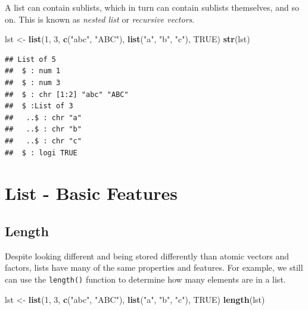 \documentclass[
]{book}
\newenvironment{Shaded}{\begin{snugshade}}{\end{snugshade}}
\newcommand{\DecValTok}[1]{\textcolor[rgb]{0.00,0.00,0.81}{#1}}
\newcommand{\KeywordTok}[1]{\textcolor[rgb]{0.13,0.29,0.53}{\textbf{#1}}}
\newcommand{\NormalTok}[1]{#1}
\newcommand{\OtherTok}[1]{\textcolor[rgb]{0.56,0.35,0.01}{#1}}
\newcommand{\StringTok}[1]{\textcolor[rgb]{0.31,0.60,0.02}{#1}}
\begin{document}
A list can contain sublists, which in turn can contain sublists themselves, and so on. This is known as \emph{nested list} or \emph{recursive vectors}.

\begin{Shaded}
\begin{Highlighting}[]
\NormalTok{lst <-}\StringTok{ }\KeywordTok{list}\NormalTok{(}\DecValTok{1}\NormalTok{, }\DecValTok{3}\NormalTok{, }\KeywordTok{c}\NormalTok{(}\StringTok{"abc"}\NormalTok{,}
    \StringTok{"ABC"}\NormalTok{), }\KeywordTok{list}\NormalTok{(}\StringTok{"a"}\NormalTok{,}
    \StringTok{"b"}\NormalTok{, }\StringTok{"c"}\NormalTok{), }\OtherTok{TRUE}\NormalTok{)}
\KeywordTok{str}\NormalTok{(lst)}
\end{Highlighting}
\end{Shaded}

\begin{verbatim}
## List of 5
##  $ : num 1
##  $ : num 3
##  $ : chr [1:2] "abc" "ABC"
##  $ :List of 3
##   ..$ : chr "a"
##   ..$ : chr "b"
##   ..$ : chr "c"
##  $ : logi TRUE
\end{verbatim}

\hypertarget{list---basic-features}{%
\section{List - Basic Features}\label{list---basic-features}}

\hypertarget{length-2}{%
\subsection{Length}\label{length-2}}

Despite looking different and being stored differently than atomic vectors and factors, lists have many of the same properties and features. For example, we still can use the \texttt{length()} function to determine how many elements are in a list.

\begin{Shaded}
\begin{Highlighting}[]
\NormalTok{lst <-}\StringTok{ }\KeywordTok{list}\NormalTok{(}\DecValTok{1}\NormalTok{, }\DecValTok{3}\NormalTok{, }\KeywordTok{c}\NormalTok{(}\StringTok{"abc"}\NormalTok{,}
    \StringTok{"ABC"}\NormalTok{), }\KeywordTok{list}\NormalTok{(}\StringTok{"a"}\NormalTok{,}
    \StringTok{"b"}\NormalTok{, }\StringTok{"c"}\NormalTok{), }\OtherTok{TRUE}\NormalTok{)}
\KeywordTok{length}\NormalTok{(lst)}
\end{Highlighting}
\end{Shaded}
\end{document}
